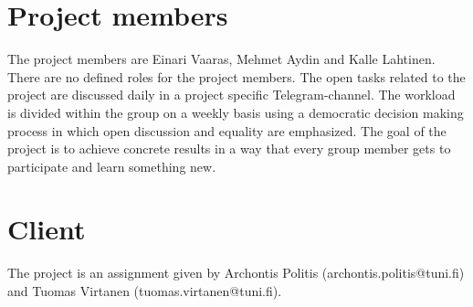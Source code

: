 \section{Project members}

The project members are Einari Vaaras, Mehmet Aydin and Kalle Lahtinen. There are no defined roles for the project members. The open tasks related to the project are discussed daily in a project specific Telegram-channel. The workload is divided within the group on a weekly basis using a democratic decision making process in which open discussion and equality are emphasized. The goal of the project is to achieve concrete results in a way that every group member gets to participate and learn something new. 

\section{Client}

The project is an assignment given by Archontis Politis (archontis.politis@tuni.fi) and Tuomas Virtanen (tuomas.virtanen@tuni.fi).

